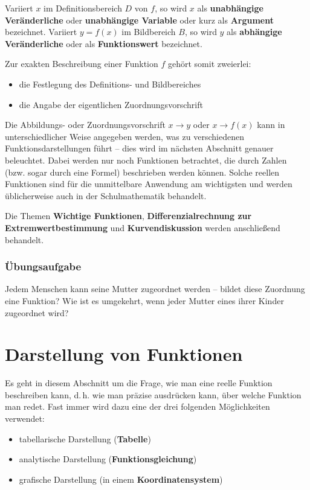 Variiert $x$ im Definitionsbereich $D$ von $f$, so wird $x$ als \textbf{unabhängige Veränderliche} oder \textbf{unabhängige Variable} oder kurz als \textbf{Argument} bezeichnet. Variiert $y = f(x)$ im Bildbereich $B$, so wird $y$ als \textbf{abhängige Veränderliche} oder als \textbf{Funktionswert} bezeichnet.

Zur exakten Beschreibung einer Funktion $f$ gehört somit zweierlei:
\begin{itemize}
  \item die Festlegung des Definitions- und Bildbereiches
  \item die Angabe der eigentlichen Zuordnungsvorschrift
\end{itemize}

Die Abbildungs- oder Zuordnungsvorschrift $x \rightarrow y$ oder $x \rightarrow f(x)$ kann in unterschiedlicher Weise angegeben werden, was zu verschiedenen Funktionsdarstellungen führt -- dies wird im nächsten Abschnitt genauer beleuchtet. Dabei werden nur noch Funktionen betrachtet, die durch Zahlen (bzw. sogar durch eine Formel) beschrieben werden können. Solche reellen Funktionen sind für die unmittelbare Anwendung am wichtigsten und werden üblicherweise auch in der Schulmathematik behandelt.

Die Themen \textbf{Wichtige Funktionen}, \textbf{Differenzialrechnung zur Extremwertbestimmung} und \textbf{Kurvendiskussion} werden anschließend behandelt.

\subsubsection{Übungsaufgabe}

\begin{graukasten}
  Jedem Menschen kann seine Mutter zugeordnet werden -- bildet diese Zuordnung eine Funktion? Wie ist es umgekehrt, wenn jeder Mutter eines ihrer Kinder zugeordnet wird?
\end{graukasten}

\section{Darstellung von Funktionen}

Es geht in diesem Abschnitt um die Frage, wie man eine reelle Funktion beschreiben kann, d.\,h. wie man präzise ausdrücken kann, über welche Funktion man redet. Fast immer wird dazu eine der drei folgenden Möglichkeiten verwendet:
\begin{itemize}
  \item tabellarische Darstellung (\textbf{Tabelle})
  \item analytische Darstellung (\textbf{Funktionsgleichung})
  \item grafische Darstellung (in einem \textbf{Koordinatensystem})
\end{itemize}


